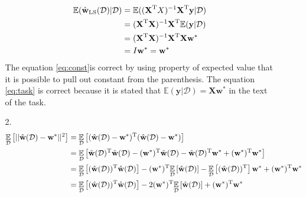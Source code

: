 \documentclass[10pt,a4paper]{article}
\begin{document}
\begin{enumerate}
\begin{enumerate}
\begin{align}
\mathbb{E}(\hat{\textbf{w}}_\text{LS}(\mathcal{D}) \vert \mathcal{D}) 
&= \mathbb{E}((\textbf{X} ^ \text{T}X)^{-1}\textbf{X} ^ \text{T}\textbf{y}\vert \mathcal{D})\nonumber \\
&= (\textbf{X} ^ \text{T}\textbf{X})^{-1}\textbf{X} ^ \text{T}\mathbb{E}(\textbf{y}\vert \mathcal{D}) \label{eq:const} \\
&= (\textbf{X} ^ \text{T}\textbf{X})^{-1}\textbf{X} ^ \text{T}\textbf{X}\textbf{w}^* \label{eq:task}\\
&= I\textbf{w}^* = \textbf{w}^*  \nonumber
\end{align}
The equation \ref{eq:const}is correct by using property of expected value that it is possible to pull out constant from the parenthesis. The equation \ref{eq:task} is correct because it is stated that $\mathbb{E}(\textbf{y}\vert \mathcal{D})=\textbf{X}\textbf{w}^* $ in the text of the task. 
\item[2.]
\begin{align}
\underset{\mathcal{D}}{\mathbb{E}} \left[ \vert\vert \hat{\textbf{w}}(\mathcal{D})-\textbf{w}^*\vert \vert ^2\right]
 &= \underset{\mathcal{D}}{\mathbb{E}}\left[ 
(\hat{\textbf{w}}(\mathcal{D})-\textbf{w}^*) ^ \text{T}(\hat{\textbf{w}}(\mathcal{D})-\textbf{w}^*)\right] \label{eq:product}\\
&= \underset{\mathcal{D}}{\mathbb{E}}\left[ 
\hat{\textbf{w}}(\mathcal{D}) ^ \text{T} \hat{\textbf{w}}(\mathcal{D}) - 
(\textbf{w}^*) ^ \text{T} \hat{\textbf{w}}(\mathcal{D}) - 
\hat{\textbf{w}}(\mathcal{D}) ^ \text{T} \textbf{w}^*
+ (\textbf{w}^*) ^ \text{T} \textbf{w}^*
\right] \label{eq:dis}\\
&= \underset{\mathcal{D}}{\mathbb{E}} \left[ 
(\hat{\textbf{w}}(\mathcal{D})) ^ \text{T} \hat{\textbf{w}}(\mathcal{D})\right] - 
(\textbf{w}^*) ^ \text{T} \underset{\mathcal{D}}{\mathbb{E}} \left[ \hat{\textbf{w}}(\mathcal{D})\right] - 
\underset{\mathcal{D}}{\mathbb{E}} \left[ (\hat{\textbf{w}}(\mathcal{D})) ^ \text{T} \right] \textbf{w}^*
+ (\textbf{w}^*) ^ \text{T} \textbf{w}^* \label{eq:prop}\\
&=
\underset{\mathcal{D}}{\mathbb{E}} \left[ 
(\hat{\textbf{w}}(\mathcal{D})) ^ \text{T} \hat{\textbf{w}}(\mathcal{D})\right] - 
2(\textbf{w}^*) ^ \text{T} \underset{\mathcal{D}}{\mathbb{E}} \left[ \hat{\textbf{w}}(\mathcal{D})\right]
+ (\textbf{w}^*) ^ \text{T} \textbf{w}^*\label{eq:last}
\end{align}


\end{enumerate}
\end{enumerate}
\end{document}
